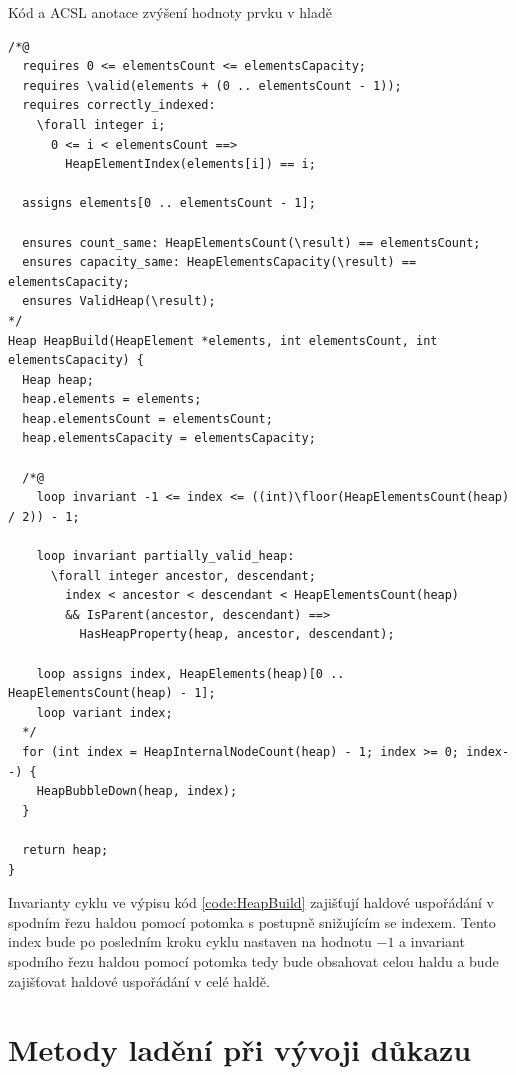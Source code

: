 \begin{listing}[H]
	\caption{Kód a ACSL anotace zvýšení hodnoty prvku v hladě}
	\label{code:HeapBuild}
	\begin{verbatim}
/*@
  requires 0 <= elementsCount <= elementsCapacity;
  requires \valid(elements + (0 .. elementsCount - 1));
  requires correctly_indexed:
    \forall integer i;
      0 <= i < elementsCount ==>
        HeapElementIndex(elements[i]) == i;

  assigns elements[0 .. elementsCount - 1];

  ensures count_same: HeapElementsCount(\result) == elementsCount;
  ensures capacity_same: HeapElementsCapacity(\result) == elementsCapacity;
  ensures ValidHeap(\result);
*/
Heap HeapBuild(HeapElement *elements, int elementsCount, int elementsCapacity) {
  Heap heap;
  heap.elements = elements;
  heap.elementsCount = elementsCount;
  heap.elementsCapacity = elementsCapacity;

  /*@
    loop invariant -1 <= index <= ((int)\floor(HeapElementsCount(heap) / 2)) - 1;

    loop invariant partially_valid_heap:
      \forall integer ancestor, descendant;
        index < ancestor < descendant < HeapElementsCount(heap)
        && IsParent(ancestor, descendant) ==>
          HasHeapProperty(heap, ancestor, descendant);

    loop assigns index, HeapElements(heap)[0 .. HeapElementsCount(heap) - 1];
    loop variant index;
  */
  for (int index = HeapInternalNodeCount(heap) - 1; index >= 0; index--) {
    HeapBubbleDown(heap, index);
  }

  return heap;
}
	\end{verbatim}
\end{listing}

Invarianty cyklu ve výpisu kód \ref{code:HeapBuild} zajišťují haldové uspořádání v spodním řezu haldou pomocí potomka s postupně snižujícím se indexem. Tento index bude po posledním kroku cyklu nastaven na hodnotu $-1$ a invariant spodního řezu haldou pomocí potomka tedy bude obsahovat celou haldu a bude zajišťovat haldové uspořádání v celé haldě.

\chapter{Metody ladění při vývoji důkazu}

